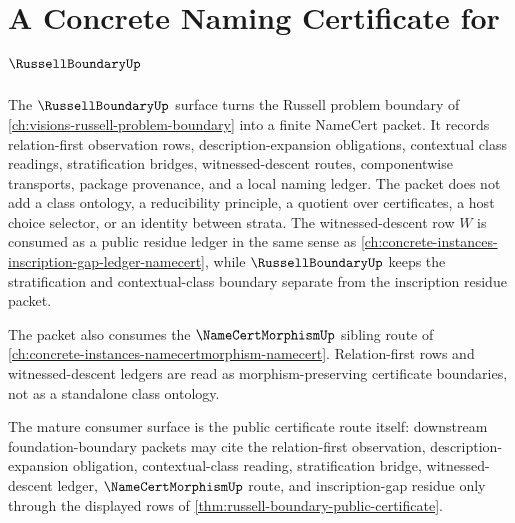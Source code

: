 \chapter{A Concrete Naming Certificate for $\RussellBoundaryUp$}
\label{ch:concrete-instances-russellboundary-namecert}

The $\RussellBoundaryUp$ surface turns the Russell problem boundary of \autoref{ch:visions-russell-problem-boundary} into a finite NameCert packet. It records relation-first observation rows, description-expansion obligations, contextual class readings, stratification bridges, witnessed-descent routes, componentwise transports, package provenance, and a local naming ledger. The packet does not add a class ontology, a reducibility principle, a quotient over certificates, a host choice selector, or an identity between strata. The witnessed-descent row $W$ is consumed as a public residue ledger in the same sense as \autoref{ch:concrete-instances-inscription-gap-ledger-namecert}, while $\RussellBoundaryUp$ keeps the stratification and contextual-class boundary separate from the inscription residue packet.

The packet also consumes the $\NameCertMorphismUp$ sibling route of \autoref{ch:concrete-instances-namecertmorphism-namecert}. Relation-first rows and witnessed-descent ledgers are read as morphism-preserving certificate boundaries, not as a standalone class ontology.

The mature consumer surface is the public certificate route itself: downstream foundation-boundary packets may cite the relation-first observation, description-expansion obligation, contextual-class reading, stratification bridge, witnessed-descent ledger, $\NameCertMorphismUp$ route, and inscription-gap residue only through the displayed rows of \autoref{thm:russell-boundary-public-certificate}.

